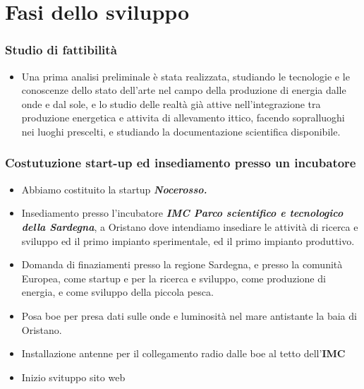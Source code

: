 \documentclass[
  onecolumn]{report}
\providecommand{\tightlist}{%
  \setlength{\itemsep}{0pt}\setlength{\parskip}{0pt}}\usepackage{longtable,booktabs,array}
\begin{document}
\hypertarget{fasi-dello-sviluppo}{%
\section{Fasi dello sviluppo}\label{fasi-dello-sviluppo}}

\hypertarget{studio-di-fattibilituxe0}{%
\subsubsection{Studio di fattibilità}\label{studio-di-fattibilituxe0}}

\begin{itemize}
\tightlist
\item
  Una prima analisi preliminale è stata realizzata, studiando le
  tecnologie e le conoscenze dello stato dell'arte nel campo della
  produzione di energia dalle onde e dal sole, e lo studio delle realtà
  già attive nell'integrazione tra produzione energetica e attivita di
  allevamento ittico, facendo sopralluoghi nei luoghi prescelti, e
  studiando la documentazione scientifica disponibile.
\end{itemize}

\hypertarget{costutuzione-start-up-ed-insediamento-presso-un-incubatore}{%
\subsubsection{Costutuzione start-up ed insediamento presso un
incubatore}\label{costutuzione-start-up-ed-insediamento-presso-un-incubatore}}

\begin{itemize}
\item
  Abbiamo costituito la startup \textbf{\emph{Nocerosso.}}
\item
  Insediamento presso l'incubatore \textbf{\emph{IMC Parco scientifico e
  tecnologico della Sardegna}}, a Oristano dove intendiamo insediare le
  attività di ricerca e sviluppo ed il primo impianto sperimentale, ed
  il primo impianto produttivo.
\item
  Domanda di finaziamenti presso la regione Sardegna, e presso la
  comunità Europea, come startup e per la ricerca e sviluppo, come
  produzione di energia, e come sviluppo della piccola pesca.
\item
  Posa boe per presa dati sulle onde e luminosità nel mare antistante la
  baia di Oristano.
\item
  Installazione antenne per il collegamento radio dalle boe al tetto
  dell'\textbf{IMC}
\item
  Inizio svituppo sito web
\end{itemize}
\end{document}
